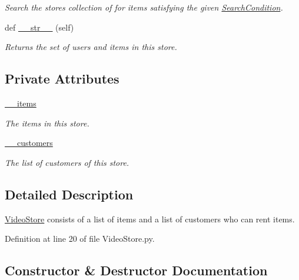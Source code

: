 \begin{DoxyCompactItemize}
\begin{DoxyCompactList}\small\item\em Search the store\textquotesingle{}s collection of for items satisfying the given \hyperlink{namespaceSearchCondition}{Search\+Condition}. \end{DoxyCompactList}\item 
def \hyperlink{classVideoStore_1_1VideoStore_a3c4bdb8e1df76ed65d00fdb32da18a3c}{\+\_\+\+\_\+str\+\_\+\+\_\+} (self)
\begin{DoxyCompactList}\small\item\em Returns the set of users and items in this store. \end{DoxyCompactList}\end{DoxyCompactItemize}
\subsection*{Private Attributes}
\begin{DoxyCompactItemize}
\item 
\hyperlink{classVideoStore_1_1VideoStore_a9b95fd49486fc2730c11920059fa1786}{\+\_\+\+\_\+items}
\begin{DoxyCompactList}\small\item\em The items in this store. \end{DoxyCompactList}\item 
\hyperlink{classVideoStore_1_1VideoStore_ab8f773ef96cc4f8aca5b845d9c32da0e}{\+\_\+\+\_\+customers}
\begin{DoxyCompactList}\small\item\em The list of customers of this store. \end{DoxyCompactList}\end{DoxyCompactItemize}


\subsection{Detailed Description}
\hyperlink{classVideoStore_1_1VideoStore}{Video\+Store} consists of a list of items and a list of customers who can rent items. 

Definition at line 20 of file Video\+Store.\+py.



\subsection{Constructor \& Destructor Documentation}
\mbox{\label{classVideoStore_1_1VideoStore_ae5c993cbfde1d6a6b872471dd8113184}} 
